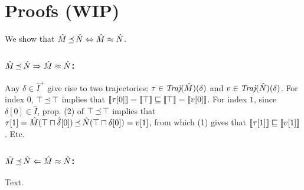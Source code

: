 \section{Proofs (WIP)}

We show that $\hat M \operatorname{\preceq} \hat N \Leftrightarrow \hat M \approx \hat N$.

\subsubsection{$\hat M \operatorname{\preceq} \hat N \Rightarrow \hat M \approx \hat N$:}

Any $\delta \in \hat I^{+}$ give rise to two trajectories: $\tau \in \operatorname{\textit{Traj}}(\hat M)(\delta)$ and $v \in \operatorname{\textit{Traj}}(\hat N)(\delta)$. For index $0$, $\top \operatorname{\preceq} \top$ implies that $\llbracket\tau[0]\rrbracket = \llbracket\top\rrbracket \sqsubseteq \llbracket\top\rrbracket = \llbracket v[0]\rrbracket$. For index $1$, since $\delta[0] \in \hat I$, prop. (2) of $\top \operatorname{\preceq} \top$ implies that $\tau[1] = \hat M(\top \sqcap \hat \delta[0]) \operatorname{\preceq} \hat N(\top \sqcap \delta[0]) = v[1]$, from which (1) gives that $\llbracket\tau[1]\rrbracket \sqsubseteq \llbracket v[1]\rrbracket$. Etc.


\subsubsection{$\hat M \operatorname{\preceq} \hat N \Leftarrow \hat M \approx \hat N$:}

Text.

